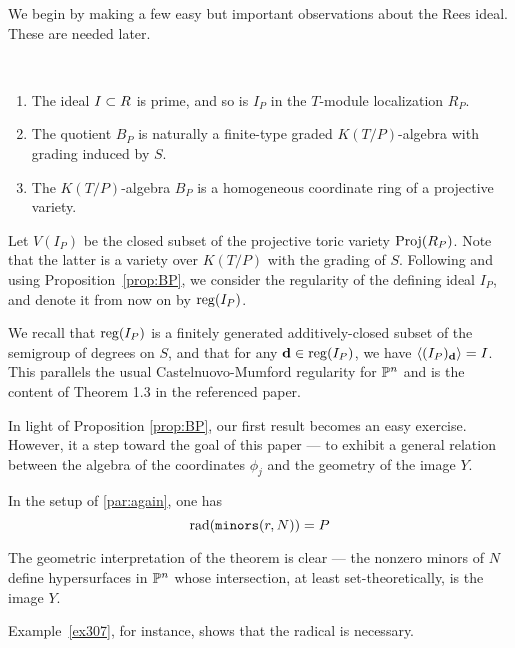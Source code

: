 \documentclass[fleqn,reqno]{amsart}
\numberwithin{first}{chapter}
\begin{document}
\begin{paragraf*}
We begin by making a few easy but important observations about the Rees ideal.
These are needed later.
\end{paragraf*}

\begin{proposition}
\label{prop:BP}~
\begin{enumerate}[label=\normalfont(\alph*)]
\item
The ideal $I\subset R$ is prime, and so is $I_P$ in the $T$-module localization $R_P$.

\item
The quotient $B_P$ is naturally a finite-type graded $K(T/P)$-algebra with grading induced by $S$.

\item\label{itm:BPKTP-alg}
The $K(T/P)$-algebra $B_P$ is a homogeneous coordinate ring of a projective variety.
\end{enumerate}
\end{proposition}

\begin{paragraf}
\label{par:reg-IP}
Let $V(I_P)$ be the closed subset of the projective toric variety $\operatorname{Proj}(R_P)$.
Note that the latter is a variety over $K(T/P)$ with the grading of $S$.
Following \citet{MS-04} and using Proposition~\ref{prop:BP},
we consider the regularity of the defining ideal $I_P$,
and denote it from now on by $\operatorname{reg}(I_P)$.

We recall that $\operatorname{reg}(I_P)$ is a finitely generated additively-closed subset
of the semigroup of degrees on $S$, and that
for any $\mathbf d\in\operatorname{reg}(I_P)$, we have $\langle(I_P)_\mathbf d\rangle=I$.
This parallels the usual Castelnuovo-Mumford regularity for $\mathbb{P}^n$
and is the content of Theorem 1.3 in the referenced paper.
\end{paragraf}

\begin{paragraf*}
In light of Proposition \ref{prop:BP}, our first result becomes an easy exercise.
However, it a step toward the goal of this paper --- to exhibit a general relation between
the algebra of the coordinates $\phi_j$ and the geometry of the image $Y$.
\end{paragraf*}

\begin{theorem}
\label{thm:rad-minors}
In the setup of \eqref{par:again}, one has
\[
\operatorname{rad}(\mathop{\tt minors}(r,N))=P
\]
\end{theorem}

\begin{paragraf*}
The geometric interpretation of the theorem is clear ---
the nonzero minors of $N$ define hypersurfaces in $\mathbb{P}^n$ whose intersection,
at least set-theoretically, is the image $Y$.

Example~\ref{ex307}, for instance, shows that the radical is necessary.
\end{paragraf*}
\end{document}
